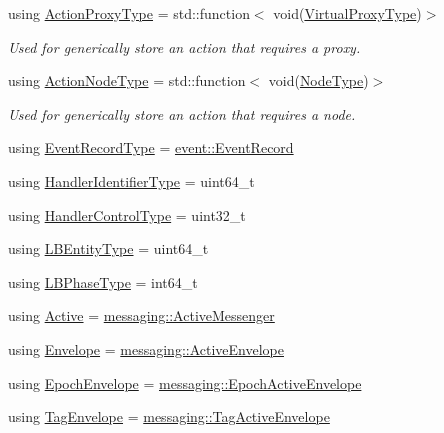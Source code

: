 \begin{DoxyCompactItemize}
using \hyperlink{namespacevt_a102aa105d64254d89f7e585d106c95aa}{Action\+Proxy\+Type} = std\+::function$<$ void(\hyperlink{namespacevt_a1b417dd5d684f045bb58a0ede70045ac}{Virtual\+Proxy\+Type})$>$
\begin{DoxyCompactList}\small\item\em Used for generically store an action that requires a proxy. \end{DoxyCompactList}\item 
using \hyperlink{namespacevt_a0436cb2d620dcbb21b5b49cd9c9c4749}{Action\+Node\+Type} = std\+::function$<$ void(\hyperlink{namespacevt_a866da9d0efc19c0a1ce79e9e492f47e2}{Node\+Type})$>$
\begin{DoxyCompactList}\small\item\em Used for generically store an action that requires a node. \end{DoxyCompactList}\item 
using \hyperlink{namespacevt_a2dc2f149222f88a250ec9a13db36865d}{Event\+Record\+Type} = \hyperlink{structvt_1_1event_1_1_event_record}{event\+::\+Event\+Record}
\item 
using \hyperlink{namespacevt_a59ae068fe828d1c33051ff96f3d016b6}{Handler\+Identifier\+Type} = uint64\+\_\+t
\item 
using \hyperlink{namespacevt_adbbef13b92f0a93b14c219b7cc8a48f2}{Handler\+Control\+Type} = uint32\+\_\+t
\item 
using \hyperlink{namespacevt_a92ec26fb6644cd0ba7eb0ee70c96bee5}{L\+B\+Entity\+Type} = uint64\+\_\+t
\item 
using \hyperlink{namespacevt_a5505d0bab25ce2ff566a8e015871b379}{L\+B\+Phase\+Type} = int64\+\_\+t
\item 
using \hyperlink{namespacevt_ad548cc368cddb926753ac237eb454dae}{Active} = \hyperlink{structvt_1_1messaging_1_1_active_messenger}{messaging\+::\+Active\+Messenger}
\item 
using \hyperlink{namespacevt_aa9c8cc094b5361482021d63012987814}{Envelope} = \hyperlink{structvt_1_1messaging_1_1_active_envelope}{messaging\+::\+Active\+Envelope}
\item 
using \hyperlink{namespacevt_af71a025689a3da5037785b53a7a8e78c}{Epoch\+Envelope} = \hyperlink{structvt_1_1messaging_1_1_epoch_active_envelope}{messaging\+::\+Epoch\+Active\+Envelope}
\item 
using \hyperlink{namespacevt_a7b951ab92dca9319e12e3fc406ccb309}{Tag\+Envelope} = \hyperlink{structvt_1_1messaging_1_1_tag_active_envelope}{messaging\+::\+Tag\+Active\+Envelope}
\item 

\end{DoxyCompactItemize}
